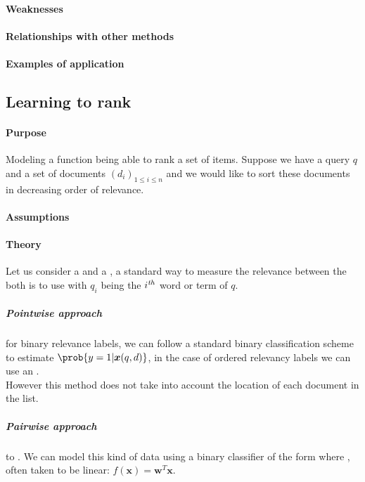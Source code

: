 \paragraph{Weaknesses}
\paragraph{Relationships with other methods}
\paragraph{Examples of application}


\subsection{Learning to rank}
\paragraph{Purpose}
Modeling a function being able to rank a set of items.
Suppose we have a query $q$ and a set of documents $(d_{i})_{1\leq i\leq n}$ and we would like to 
sort these documents in decreasing order of relevance. 

\paragraph{Assumptions}
\paragraph{Theory}
Let us consider a  and a , a standard way to measure the relevance
between the both is to use  with $q_{i}$ being the $i^{\text{\emph{th}}}$ word or term of $q$.
\subparagraph{Pointwise approach}
for binary relevance labels, we can follow a standard binary classification scheme to
estimate $\prob{y=1|\bm{x}(q,d)}$, in the case of ordered relevancy labels we can use
an .\\
However this method does not take into account the location of each document in the 
list.
\subparagraph{Pairwise approach}
to . We 
can model this kind of data using a binary classifier of the form  
where , often taken to be linear: $f(\bm{x}) = \bm{w}^{T}
\bm{x}$.

